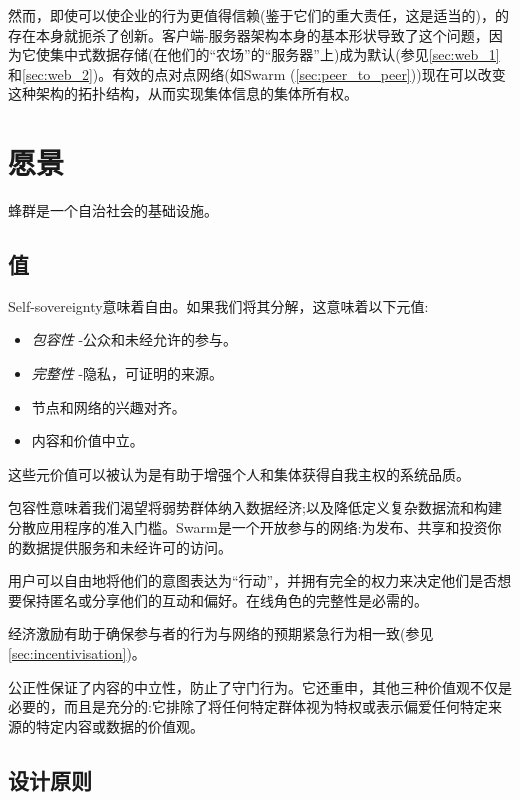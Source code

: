 然而，即使可以使企业的行为更值得信赖(鉴于它们的重大责任，这是适当的)，的存在本身就扼杀了创新。客户端-服务器架构本身的基本形状导致了这个问题，因为它使集中式数据存储(在他们的“农场”的“服务器”上)成为默认(参见\ref{sec:web_1}和\ref{sec:web_2})。有效的点对点网络(如Swarm (\ref{sec:peer_to_peer}))现在可以改变这种架构的拓扑结构，从而实现集体信息的集体所有权。 


\section{愿景\statusorange}\label{sec:vision}


\begin{displayquote}
蜂群是一个自治社会的基础设施。 
\end{displayquote}


\subsection{值\statusorange}\label{sec:values}

Self-sovereignty意味着自由。如果我们将其分解，这意味着以下元值: 

\begin{itemize}
\item \emph{包容性} -公众和未经允许的参与。  
\item \emph{完整性} -隐私，可证明的来源。 
\item 节点和网络的兴趣对齐。
\item 内容和价值中立。  
\end{itemize}

这些元价值可以被认为是有助于增强个人和集体获得自我主权的系统品质。

包容性意味着我们渴望将弱势群体纳入数据经济;以及降低定义复杂数据流和构建分散应用程序的准入门槛。Swarm是一个开放参与的网络:为发布、共享和投资你的数据提供服务和未经许可的访问。

用户可以自由地将他们的意图表达为“行动”，并拥有完全的权力来决定他们是否想要保持匿名或分享他们的互动和偏好。在线角色的完整性是必需的。 

经济激励有助于确保参与者的行为与网络的预期紧急行为相一致(参见\ref{sec:incentivisation})。 

公正性保证了内容的中立性，防止了守门行为。它还重申，其他三种价值观不仅是必要的，而且是充分的:它排除了将任何特定群体视为特权或表示偏爱任何特定来源的特定内容或数据的价值观。 

\subsection{设计原则\statusorange}\label{sec:design-principles}
 

